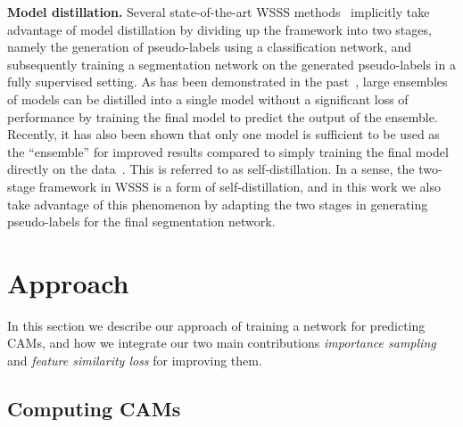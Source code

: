 \documentclass{article}
\begin{document}
\textbf{Model distillation.} Several state-of-the-art WSSS methods~\cite{wang2020cvpr, lee2019cvpr, liu2020tpami} implicitly take advantage of model distillation by dividing up the framework into two stages, namely the generation of pseudo-labels using a classification network, and subsequently training a segmentation network on the generated pseudo-labels in a fully supervised setting. As has been demonstrated in the past~\cite{bucilua2006sigkdd, hinton2015arxiv}, large ensembles of models can be distilled into a single model without a significant loss of performance by training the final model to predict the output of the ensemble. Recently, it has also been shown that only one model is sufficient to be used as the ``ensemble'' for improved results compared to simply training the final model directly on the data~\cite{allen2020arxiv}. This is referred to as self-distillation. In a sense, the two-stage framework in WSSS is a form of self-distillation, and in this work we also take advantage of this phenomenon by adapting the two stages in generating pseudo-labels for the final segmentation network.

\section{Approach}

In this section we describe our approach of training a network for predicting CAMs, and how we integrate our two main contributions \textit{importance sampling} and \textit{feature similarity loss} for improving them.

\subsection{Computing CAMs}
\label{sec_computing_cams}
\end{document}
